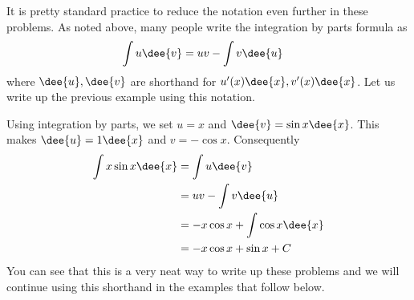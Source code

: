 It is pretty standard practice to reduce the notation even further in these
problems. As noted above, many people write the integration by parts formula as
\begin{align*}
  \int u\dee{v} &= uv - \int v \dee{u}
\end{align*}
where $\dee{u}, \dee{v}$ are shorthand for $u'(x)\dee{x}, v'(x)\dee{x}$. Let us
write up the previous example using this notation.
\begin{eg}\label{eg:PRTSxsinx}
\soln Using integration by parts, we set $u=x$ and $\dee{v}=\sin x\dee{x}$. This makes
$\dee{u}= 1\dee{x}$ and $v=-\cos x$. Consequently
\begin{align*}
  \int x \sin x \dee{x} &= \int u\dee{v} \\
  &= uv - \int v\dee{u} \\
  &= -x\cos x + \int \cos x \dee{x} \\
  &= -x \cos x +\sin x + C
\end{align*}
You can see that this is a very neat way to write up these problems and we will
continue using this shorthand in the examples that follow below.

\end{eg}




